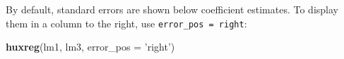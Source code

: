 \documentclass[]{article}
\newenvironment{Shaded}{\begin{snugshade}}{\end{snugshade}}
\newcommand{\DataTypeTok}[1]{\textcolor[rgb]{0.13,0.29,0.53}{#1}}
\newcommand{\KeywordTok}[1]{\textcolor[rgb]{0.13,0.29,0.53}{\textbf{#1}}}
\newcommand{\NormalTok}[1]{#1}
\newcommand{\StringTok}[1]{\textcolor[rgb]{0.31,0.60,0.02}{#1}}
\begin{document}
\FloatBarrier

By default, standard errors are shown below coefficient estimates. To
display them in a column to the right, use
\texttt{error\_pos\ =\ \textquotesingle{}right\textquotesingle{}}:

\begin{Shaded}
\begin{Highlighting}[]
\KeywordTok{huxreg}\NormalTok{(lm1, lm3, }\DataTypeTok{error_pos =} \StringTok{'right'}\NormalTok{)}
\end{Highlighting}
\end{Shaded}

 
  \providecommand{\huxb}[2]{\arrayrulecolor[RGB]{#1}\global\arrayrulewidth=#2pt}
  \providecommand{\huxvb}[2]{\color[RGB]{#1}\vrule width #2pt}
  \providecommand{\huxtpad}[1]{\rule{0pt}{\baselineskip+#1}}
  \providecommand{\huxbpad}[1]{\rule[-#1]{0pt}{#1}}
\end{document}
